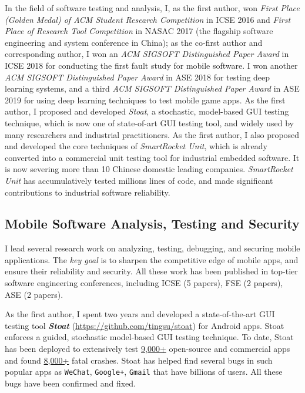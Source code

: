 \documentclass[a4paper]{article}
\begin{document}
In the field of software testing and analysis, I, as the first author, won \emph{First Place (Golden Medal) of ACM Student Research Competition} in ICSE 2016 and \emph{First Place of Research Tool Competition} in NASAC 2017 (the flagship software engineering and system conference in China); as the co-first author and corresponding author, I won an \emph{ACM SIGSOFT Distinguished Paper Award} in ICSE 2018 for conducting the first fault study for mobile software. I won another \emph{ACM SIGSOFT Distinguished Paper Award} in ASE 2018 for testing deep learning systems, and a third \emph{ACM SIGSOFT Distinguished Paper Award} in ASE 2019 for using deep learning techniques to test mobile game apps. As the first author, I proposed and developed \emph{Stoat}, a stochastic, model-based GUI testing technique, which is now one of state-of-art GUI testing tool, and widely used by many researchers and industrial practitioners.
As the first author, I also proposed and developed the core techniques of \emph{SmartRocket Unit}, which is already converted into a commercial unit testing tool for industrial embedded software. It is now severing more than 10 Chinese domestic leading companies. \emph{SmartRocket Unit} has accumulatively tested millions lines of code, and made significant contributions to industrial software reliability.


\subsection{Mobile Software Analysis, Testing and Security}
\label{mobile}

I lead several research work on analyzing, testing, debugging, and securing mobile applications. The \emph{key goal} is to sharpen the competitive edge of mobile apps, and ensure their reliability and security.
All these work has been published in top-tier software engineering conferences, including ICSE (5 papers), FSE (2 papers), ASE (2 papers).

As the first author, I spent two years and developed a state-of-the-art GUI testing tool \emph{\textbf{Stoat}} (\url{https://github.com/tingsu/stoat}) for Android apps.
Stoat enforces a guided, stochastic model-based GUI testing technique.
To date, Stoat has been deployed to extensively test \underline{9,000+} open-source and commercial apps and found \underline{8,000+} fatal crashes. Stoat has helped find several bugs in such popular apps as \texttt{WeChat}, \texttt{Google+}, \texttt{Gmail} that have billions of users. All these bugs have been confirmed and fixed. 
\end{document}
